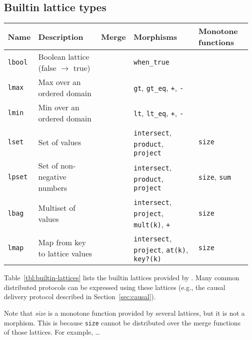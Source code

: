 \subsection{Builtin lattice types}
\label{sec:lattice-builtins}

\begin{table*}[t]
\begin{tabular}{|l|l|l|l|l|}
\hline
\textbf{Name} & \textbf{Description} & \textbf{Merge} & \textbf{Morphisms} &
\textbf{Monotone functions}\\
\hline
\texttt{lbool} & Boolean lattice (false $\to$ true) & & \texttt{when\_true} & \\
\texttt{lmax} & Max over an ordered domain & &\texttt{gt},
\texttt{gt\_eq}, \texttt{+}, \texttt{-} & \\
\texttt{lmin} & Min over an ordered domain & &\texttt{lt}, \texttt{lt\_eq},
\texttt{+}, \texttt{-} & \\
\texttt{lset} & Set of values & & \texttt{intersect}, \texttt{product},
\texttt{project} & \texttt{size} \\
\texttt{lpset} & Set of non-negative numbers & &
\texttt{intersect}, \texttt{product}, \texttt{project}& \texttt{size}, \texttt{sum} \\
\texttt{lbag} & Multiset of values & & \texttt{intersect},
\texttt{project}, \texttt{mult(k)}, \texttt{+} & \texttt{size}\\
\texttt{lmap} & Map from key to lattice values & &
\texttt{intersect}, \texttt{project}, \texttt{at(k)}, \texttt{key?(k)} & \texttt{size}\\
\hline
\end{tabular}
\caption{Builtin lattices in \lang.}
\label{tbl:builtin-lattices}
\end{table*}

Table~\ref{tbl:builtin-lattices} lists the builtin lattices provided by
\lang. Many common distributed protocols can be expressed using these lattices
(e.g., the causal delivery protocol described in Section~\ref{sec:causal}).

Note that \emph{size} is a monotone function provided by several lattices, but
it is not a morphism. This is because \texttt{size} cannot be distributed over
the merge functions of those lattices. For example, \ldots

